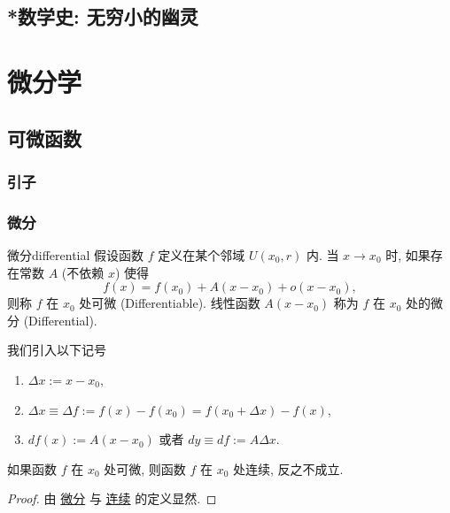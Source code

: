 \documentclass[cn,toc=twocol]{elegantbook}
\newcommand{\ITEMS}{\begin{enumerate}}
\newcommand{\ITEME}{\end{enumerate}}
\begin{document}
\section{*数学史: 无穷小的幽灵}



\chapter{微分学}
\section{可微函数}

\subsection{引子}

\subsection{微分}

\begin{definition}{微分}{differential}
	假设函数 $f$ 定义在某个邻域 $U(x_0,r)$ 内. 当 $x \to x_0$ 时, 如果存在常数 $A$ (不依赖 $x$) 使得
	\[
		f(x) = f(x_0) + A(x - x_0) + o(x - x_0),
	\]
则称 $f$ 在 $x_0$ 处可微 (Differentiable). 线性函数 $A(x - x_0)$ 称为 $f$ 在 $x_0$ 处的微分 (Differential).
\end{definition}

我们引入以下记号
\ITEMS
	\item $\Delta x := x - x_0$,
	\item $\Delta x \equiv \Delta f := f(x) - f(x_0) = f(x_0 + \Delta x) - f(x)$,
	\item $df(x) := A (x - x_0)$ 或者 $dy \equiv df := A \Delta x$.
\ITEME

\begin{theorem}
	如果函数 $f$ 在 $x_0$ 处可微, 则函数 $f$ 在 $x_0$ 处连续, 反之不成立.
\end{theorem}

\begin{proof}
	由 \hyperref[def:differential]{微分} 与 \hyperref[def:continuous]{连续} 的定义显然.
\end{proof}
\end{document}
